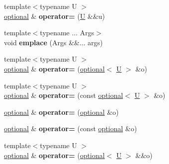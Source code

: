 \begin{DoxyCompactItemize}
\mbox{\label{classaacio_1_1optional_a4fbd1b922cfb0d0edc00b2e44f7ef789}} 
{\footnotesize template$<$typename U $>$ }\\\mbox{\hyperlink{classaacio_1_1optional}{optional}} \& {\bfseries operator=} (\mbox{\hyperlink{union_u}{U}} \&\&u)
\item 
\mbox{\label{classaacio_1_1optional_a9ac40cab1d5c818a6839aeda0bf7bfc5}} 
{\footnotesize template$<$typename ... Args$>$ }\\void {\bfseries emplace} (Args \&\&... args)
\item 
\mbox{\label{classaacio_1_1optional_af930244475107c4004cf7b6c3c0ceb7d}} 
{\footnotesize template$<$typename U $>$ }\\\mbox{\hyperlink{classaacio_1_1optional}{optional}} \& {\bfseries operator=} (\mbox{\hyperlink{classaacio_1_1optional}{optional}}$<$ \mbox{\hyperlink{union_u}{U}} $>$ \&o)
\item 
\mbox{\label{classaacio_1_1optional_aef5ccdf76041e72b9d74c1e8628c465e}} 
{\footnotesize template$<$typename U $>$ }\\\mbox{\hyperlink{classaacio_1_1optional}{optional}} \& {\bfseries operator=} (const \mbox{\hyperlink{classaacio_1_1optional}{optional}}$<$ \mbox{\hyperlink{union_u}{U}} $>$ \&o)
\item 
\mbox{\label{classaacio_1_1optional_a260aed74bb97079b1da6989d4372c11e}} 
\mbox{\hyperlink{classaacio_1_1optional}{optional}} \& {\bfseries operator=} (\mbox{\hyperlink{classaacio_1_1optional}{optional}} \&o)
\item 
\mbox{\label{classaacio_1_1optional_a24e3700e8f4f86a8a5176f9848c46bbf}} 
\mbox{\hyperlink{classaacio_1_1optional}{optional}} \& {\bfseries operator=} (const \mbox{\hyperlink{classaacio_1_1optional}{optional}} \&o)
\item 
\mbox{\label{classaacio_1_1optional_a4e30a2411077c3cf54497e2caa3539b9}} 
{\footnotesize template$<$typename U $>$ }\\\mbox{\hyperlink{classaacio_1_1optional}{optional}} \& {\bfseries operator=} (\mbox{\hyperlink{classaacio_1_1optional}{optional}}$<$ \mbox{\hyperlink{union_u}{U}} $>$ \&\&o)

\end{DoxyCompactItemize}
